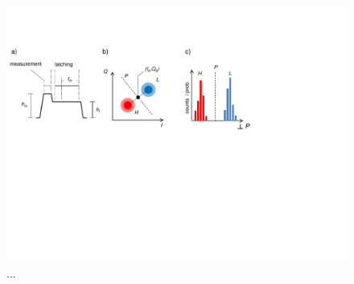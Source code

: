 \begin{figure}[ht!]
\centering
\includegraphics[width=\textwidth]{./material/figures/measurement/readout}
\caption{...}
\label{fig:readout_bringup}
\end{figure}

